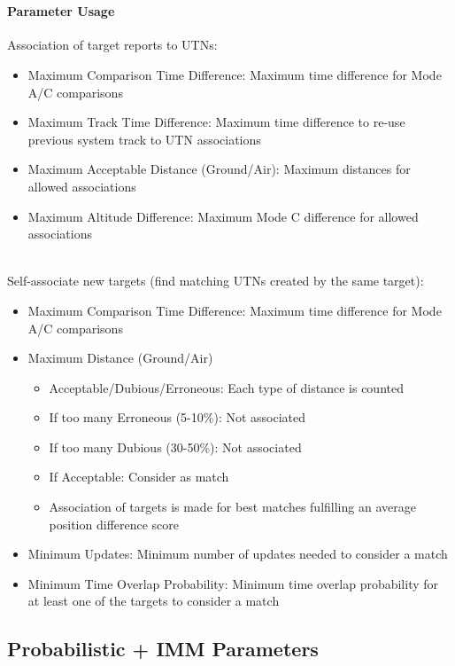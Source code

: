 \ \\

\paragraph{Parameter Usage}

Association of target reports to UTNs:
\begin{itemize}
\item Maximum Comparison Time Difference: Maximum time difference for Mode A/C comparisons
\item Maximum Track Time Difference: Maximum time difference to re-use previous system track to UTN associations
\item Maximum Acceptable Distance (Ground/Air): Maximum distances for allowed associations
\item Maximum Altitude Difference: Maximum Mode C difference for allowed associations
\end{itemize}
\ \\

Self-associate new targets (find matching UTNs created by the same target):
\begin{itemize}
\item Maximum Comparison Time Difference: Maximum time difference for Mode A/C comparisons
\item Maximum Distance (Ground/Air)
\begin{itemize}
\item Acceptable/Dubious/Erroneous: Each type of distance is counted
\item If too many Erroneous (5-10\%): Not associated
\item If too many Dubious (30-50\%): Not associated
\item If Acceptable: Consider as match
\item Association of targets is made for best matches fulfilling an average position difference score
\end{itemize}
\item Minimum Updates: Minimum number of updates needed to consider a match
\item Minimum Time Overlap Probability: Minimum time overlap probability for at least one of the targets to consider a match
\end{itemize}

\subsection{Probabilistic + IMM Parameters}

